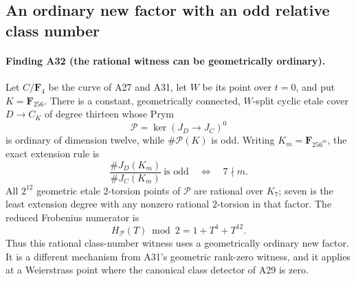 \subsection{An ordinary new factor with an odd relative class number}
\label{sec:ordinary-rational-witness}

\paragraph{Finding A32 (the rational witness can be geometrically ordinary).}
Let $C/\mathbf F_4$ be the curve of A27 and A31, let $W$ be its
point over $t=0$, and put $K=\mathbf F_{256}$.  There is a constant,
geometrically connected, $W$-split cyclic etale cover $D\to C_K$
of degree thirteen whose Prym
\[
             \mathcal P=\ker(J_D\longrightarrow J_C)^0
 \tag{OR.1}
\]
is ordinary of dimension twelve, while $\#\mathcal P(K)$ is odd.
Writing $K_m=\mathbf F_{256^m}$, the exact extension rule is
\[
 \frac{\#J_D(K_m)}{\#J_C(K_m)}\ \text{is odd}
             \quad\Longleftrightarrow\quad 7\nmid m.
 \tag{OR.2}
\]
All $2^{12}$ geometric etale $2$-torsion points of $\mathcal P$
are rational over $K_7$; seven is the least extension degree
with any nonzero rational $2$-torsion in that factor.
The reduced Frobenius numerator is
\[
                H_{\mathcal P}(T)\bmod2=1+T^4+T^{12}.
 \tag{OR.3}
\]
Thus this rational class-number witness uses a geometrically
ordinary new factor.  It is a different mechanism from A31's
geometric rank-zero witness, and it applies at a Weierstrass
point where the canonical class detector of A29 is zero.


